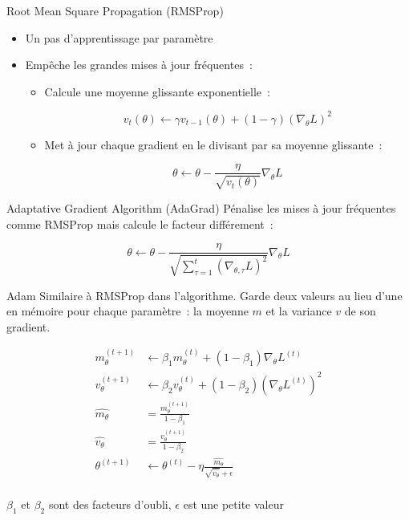 \begin{frame}{Root Mean Square Propagation (RMSProp)}
  \begin{itemize}[<+->]
    \item Un pas d'apprentissage par paramètre
    \item Empêche les grandes mises à jour fréquentes~:
      \begin{itemize}
        \item Calcule une moyenne glissante exponentielle~:

        \[v_t(\theta) \leftarrow \gamma v_{t-1}(\theta) + (1 - \gamma)(\nabla_\theta L)^2\]

        \item Met à jour chaque gradient en le divisant par sa moyenne glissante~:

        \[\theta \leftarrow \theta - \frac{\eta}{\sqrt{v_t(\theta)}}\nabla_\theta L\]
      \end{itemize}
  \end{itemize}
\end{frame}

\begin{frame}{Adaptative Gradient Algorithm (AdaGrad)}
  Pénalise les mises à jour fréquentes comme RMSProp mais calcule le facteur différement~:

  \[
    \theta \leftarrow \theta - \frac{\eta}{\sqrt{\sum_{\tau=1}^t(\nabla_{\theta,\tau} L)^2}}\nabla_{\theta} L
  \]
\end{frame}

\begin{frame}{Adam}
  Similaire à RMSProp dans l'algorithme. Garde deux valeurs au lieu d'une en mémoire pour chaque paramètre~: la moyenne $m$ et la variance $v$ de son gradient.

  \begin{align*}
    m_\theta^{(t+1)} &\leftarrow \beta_1m_\theta^{(t)} + (1 - \beta_1)\nabla_\theta L^{(t)} \\
    v_\theta^{(t+1)} &\leftarrow \beta_2v_\theta^{(t)} + (1 - \beta_2)(\nabla_\theta L^{(t)})^2 \\
    \hat{m_\theta} &= \frac{m_\theta^{(t+1)}}{1 - \beta_1} \\
    \hat{v_\theta} &= \frac{v_\theta^{(t+1)}}{1 - \beta_2} \\
    \theta^{(t+1)} &\leftarrow \theta^{(t)} - \eta\frac{\hat{m_\theta}}{\sqrt{\hat{v_\theta}} + \epsilon} \\
  \end{align*}

  $\beta_1$ et $\beta_2$ sont des facteurs d'oubli, $\epsilon$ est une petite valeur
\end{frame}
